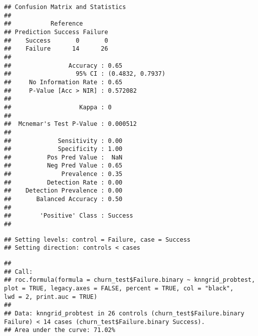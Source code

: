 \documentclass[
]{article}
\newenvironment{Shaded}{\begin{snugshade}}{\end{snugshade}}
\newcommand{\AttributeTok}[1]{\textcolor[rgb]{0.77,0.63,0.00}{#1}}
\newcommand{\CommentTok}[1]{\textcolor[rgb]{0.56,0.35,0.01}{\textit{#1}}}
\newcommand{\ConstantTok}[1]{\textcolor[rgb]{0.00,0.00,0.00}{#1}}
\newcommand{\DecValTok}[1]{\textcolor[rgb]{0.00,0.00,0.81}{#1}}
\newcommand{\FunctionTok}[1]{\textcolor[rgb]{0.00,0.00,0.00}{#1}}
\newcommand{\NormalTok}[1]{#1}
\newcommand{\OtherTok}[1]{\textcolor[rgb]{0.56,0.35,0.01}{#1}}
\newcommand{\SpecialCharTok}[1]{\textcolor[rgb]{0.00,0.00,0.00}{#1}}
\newcommand{\StringTok}[1]{\textcolor[rgb]{0.31,0.60,0.02}{#1}}
\begin{document}
\begin{verbatim}
## Confusion Matrix and Statistics
## 
##           Reference
## Prediction Success Failure
##    Success       0       0
##    Failure      14      26
##                                           
##                Accuracy : 0.65            
##                  95% CI : (0.4832, 0.7937)
##     No Information Rate : 0.65            
##     P-Value [Acc > NIR] : 0.572082        
##                                           
##                   Kappa : 0               
##                                           
##  Mcnemar's Test P-Value : 0.000512        
##                                           
##             Sensitivity : 0.00            
##             Specificity : 1.00            
##          Pos Pred Value :  NaN            
##          Neg Pred Value : 0.65            
##              Prevalence : 0.35            
##          Detection Rate : 0.00            
##    Detection Prevalence : 0.00            
##       Balanced Accuracy : 0.50            
##                                           
##        'Positive' Class : Success         
## 
\end{verbatim}

\begin{Shaded}
\end{Shaded}

\begin{verbatim}
## Setting levels: control = Failure, case = Success
## Setting direction: controls < cases
\end{verbatim}

\begin{verbatim}
## 
## Call:
## roc.formula(formula = churn_test$Failure.binary ~ knngrid_probtest,     plot = TRUE, legacy.axes = FALSE, percent = TRUE, col = "black",     lwd = 2, print.auc = TRUE)
## 
## Data: knngrid_probtest in 26 controls (churn_test$Failure.binary Failure) < 14 cases (churn_test$Failure.binary Success).
## Area under the curve: 71.02%
\end{verbatim}
\end{document}
